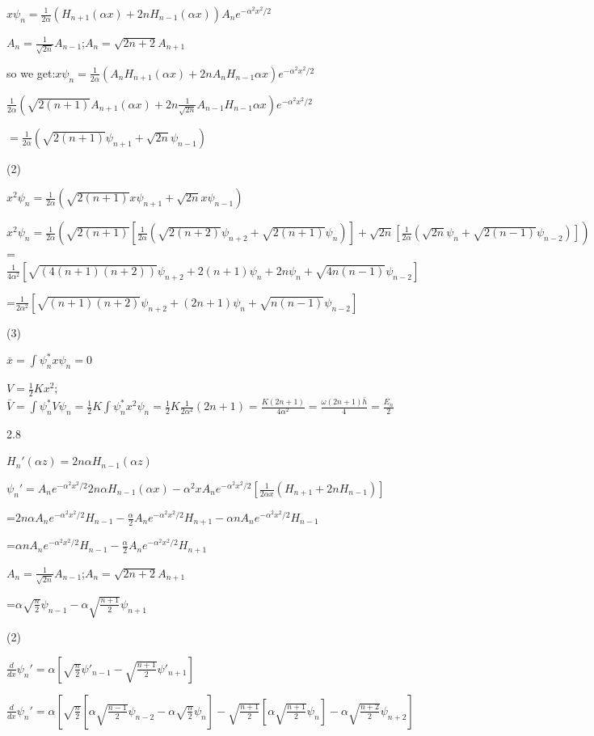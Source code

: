 \documentclass{article}
\begin{document}
$x\psi_n=\frac1{2\alpha}(H_{n+1}(\alpha x)+2nH_{n-1}(\alpha x))A_ne^{-\alpha^2x^2/2}$

$A_n=\frac1{\sqrt{2n}}A_{n-1}$;$A_n=\sqrt{2n+2}A_{n+1}$ 

so we get:$x\psi_n=\frac1{2\alpha}(A_nH_{n+1}(\alpha x)+2nA_nH_{n-1}{\alpha x})e^{-\alpha^2x^2/2}$

$\frac1{2\alpha}(\sqrt{2(n+1)}A_{n+1}(\alpha x)+2n\frac1{\sqrt{2n}}A_{n-1}H_{n-1}{\alpha x})e^{-\alpha^2x^2/2}$

$=\frac1{2\alpha}(\sqrt{2(n+1)}\psi_{n+1}+\sqrt{2n}\psi_{n-1})$

(2)

$x^2\psi_n=\frac1{2\alpha}(\sqrt{2(n+1)}x\psi_{n+1}+\sqrt{2n}x\psi_{n-1})$

$x^2\psi_n=\frac1{2\alpha}(\sqrt{2(n+1)}[\frac1{2\alpha}(\sqrt{2(n+2)}\psi_{n+2}+\sqrt{2(n+1)}\psi_{n})]+\sqrt{2n}[\frac1{2\alpha}(\sqrt{2n}\psi_n+\sqrt{2(n-1)}\psi_{n-2})])$=$\frac1{4\alpha^2}[\sqrt{(4(n+1)(n+2))}\psi_{n+2}+2(n+1)\psi_n+2n\psi_n+\sqrt{4n(n-1)}\psi_{n-2}]$

=$\frac1{2\alpha^2}[\sqrt{(n+1)(n+2)}\psi_{n+2}+(2n+1)\psi_n+\sqrt{n(n-1)}\psi_{n-2}]$

(3)

$\bar x=\int \psi_n^*x\psi_n=0$

$V=\frac12Kx^2$;$\bar V=\int \psi_n^*V\psi_n=\frac12K\int \psi_n^*x^2\psi_n=\frac12K\frac1{2\alpha^2}(2n+1)=\frac{K(2n+1)}{4\alpha^2}=\frac{\omega(2n+1)\bar h}{4}=\frac{E_n}2$

2.8 

$H_n'(\alpha z)=2n\alpha H_{n-1}(\alpha z)$

$\psi_n'=A_ne^{-\alpha^2x^2/2}2n\alpha H_{n-1}(\alpha x)-\alpha^2 xA_ne^{-\alpha^2x^2/2}[\frac1{2\alpha x}(H_{n+1}+2nH_{n-1})]$

=$2n\alpha A_ne^{-\alpha^2x^2/2}H_{n-1}-\frac{\alpha}2A_ne^{-\alpha^2x^2/2}H_{n+1}-\alpha n A_ne^{-\alpha^2x^2/2}H_{n-1}$

=$\alpha nA_ne^{-\alpha^2x^2/2}H_{n-1}-\frac{\alpha}2A_ne^{-\alpha^2x^2/2}H_{n+1}$

$A_n=\frac1{\sqrt{2n}}A_{n-1}$;$A_n=\sqrt{2n+2}A_{n+1}$ 

=$\alpha\sqrt{\frac{n}{2}}\psi_{n-1}-\alpha\sqrt{\frac{n+1}2}\psi_{n+1}$

(2)

$\frac{d}{dx}\psi_n'=\alpha[\sqrt{\frac{n}{2}}\psi'_{n-1}-\sqrt{\frac{n+1}2}\psi'_{n+1}]$

$\frac{d}{dx}\psi_n'=\alpha[\sqrt{\frac{n}{2}}[\alpha\sqrt{\frac{n-1}2}\psi_{n-2}-\alpha\sqrt{\frac{n}2}\psi_{n}]-\sqrt{\frac{n+1}2}[\alpha\sqrt{\frac{n+1}2}\psi_n]-\alpha\sqrt{\frac{n+2}2}\psi_{n+2}]$
\end{document}
